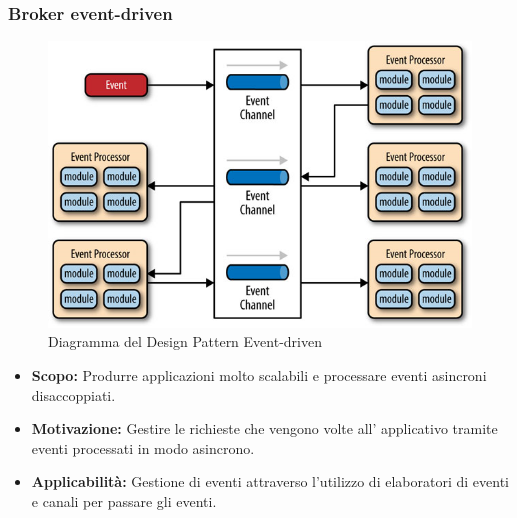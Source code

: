 \documentclass[a4paper]{article}
\begin{document}
	\subsubsection{Broker event-driven}
				\begin{figure}[H]
					\centering
					\includegraphics[width=\textwidth]{immagini/ST/schemaevent-driven.png}
					\caption{Diagramma del Design Pattern Event-driven}
				\end{figure}
            \begin{itemize}
				\item \textbf{Scopo:}
					Produrre applicazioni molto scalabili e processare eventi asincroni disaccoppiati.
                \item \textbf{Motivazione:} Gestire le richieste che vengono volte all' applicativo tramite eventi processati in modo asincrono.
                \item \textbf{Applicabilità:}
                	Gestione di eventi attraverso l'utilizzo di elaboratori di eventi e canali per passare gli eventi.		
			\end{itemize}
	
				
\end{document}
